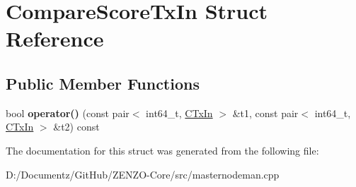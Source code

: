 \hypertarget{struct_compare_score_tx_in}{}\section{Compare\+Score\+Tx\+In Struct Reference}
\label{struct_compare_score_tx_in}
\subsection*{Public Member Functions}
\begin{DoxyCompactItemize}
\item 
\mbox{\label{struct_compare_score_tx_in_a74c297c50718515022c5850c3e324e26}} 
bool {\bfseries operator()} (const pair$<$ int64\+\_\+t, \mbox{\hyperlink{class_c_tx_in}{C\+Tx\+In}} $>$ \&t1, const pair$<$ int64\+\_\+t, \mbox{\hyperlink{class_c_tx_in}{C\+Tx\+In}} $>$ \&t2) const
\end{DoxyCompactItemize}


The documentation for this struct was generated from the following file\+:\begin{DoxyCompactItemize}
\item 
D\+:/\+Documentz/\+Git\+Hub/\+Z\+E\+N\+Z\+O-\/\+Core/src/masternodeman.\+cpp\end{DoxyCompactItemize}
